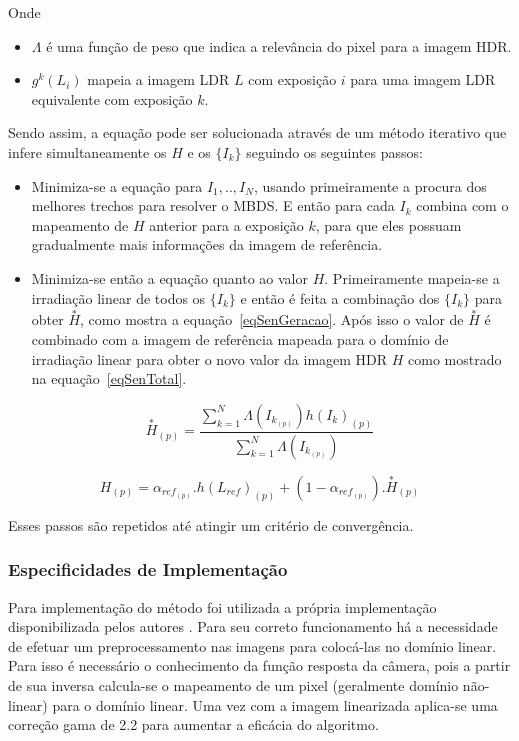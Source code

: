 Onde

\begin{itemize}
	\item $\Lambda$ é uma função de peso que indica a relevância do pixel para a imagem HDR.
	\item $g^k(L_i)$ mapeia a imagem LDR $L$ com exposição $i$ para uma imagem LDR equivalente com exposição $k$.
\end{itemize}

Sendo assim, a equação pode ser solucionada através de um método iterativo que infere simultaneamente os $H$ e os $\{I_k\}$ seguindo os seguintes passos:

\begin{itemize}
	\item Minimiza-se a equação para $I_1,..,I_N$, usando primeiramente a procura dos melhores trechos para resolver o MBDS. E então para cada $I_k$ combina com o mapeamento de $H$ anterior para a exposição $k$, para que eles possuam gradualmente mais informações da imagem de referência.
	\item Minimiza-se então a equação quanto ao valor $H$. Primeiramente mapeia-se a irradiação linear de todos os $\{I_k\}$ e então é feita a combinação dos $\{I_k\}$ para obter $\overset{*}{H}$, como mostra a equação~\ref{eqSenGeracao}. Após isso o valor de $\overset{*}{H}$ é combinado com a imagem de referência mapeada para o domínio de irradiação linear para obter o novo valor da imagem HDR $H$ como mostrado na equação~\ref{eqSenTotal}.
\end{itemize}

\begin{equation} \label{eqSenGeracao}
	\overset{*}{H}_{(p)} = \frac{\sum\limits_{k = 1}^N{\Lambda(I_{k_{(p)}})h(I_k)_{(p)}}}{\sum\limits_{k = 1}^N{\Lambda(I_{k_{(p)}})}}
\end{equation}

\begin{equation} \label{eqSenTotal}
	H_{(p)} = \alpha_{ref_{(p)}}.h(L_{ref})_{(p)} + (1-\alpha_{ref_{(p)}}).\overset{*}{H}_{(p)}
\end{equation}

Esses passos são repetidos até atingir um critério de convergência.

\subsubsection{Especificidades de Implementação} \label{MetodoSenImplementacao}

Para implementação do método foi utilizada a própria implementação disponibilizada pelos autores \cite{hdrMovimento}. Para seu correto funcionamento há a necessidade de efetuar um preprocessamento nas imagens para colocá-las no domínio linear. Para isso é necessário o conhecimento da função resposta da câmera, pois a partir de sua inversa calcula-se o mapeamento de um pixel (geralmente domínio não-linear) para o domínio linear. Uma vez com a imagem linearizada aplica-se uma correção gama de 2.2 para aumentar a eficácia do algoritmo.

